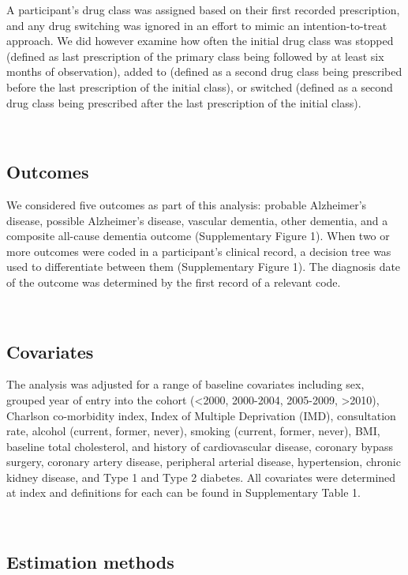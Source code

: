 \documentclass[a4paper, twoside]{templates/ociamthesis}
\begin{document}
A participant's drug class was assigned based on their first recorded prescription, and any drug switching was ignored in an effort to mimic an intention-to-treat approach. We did however examine how often the initial drug class was stopped (defined as last prescription of the primary class being followed by at least six months of observation), added to (defined as a second drug class being prescribed before the last prescription of the initial class), or switched (defined as a second drug class being prescribed after the last prescription of the initial class).

~

\hypertarget{outcomes}{%
\subsection{Outcomes}\label{outcomes}}

We considered five outcomes as part of this analysis: probable Alzheimer's disease, possible Alzheimer's disease, vascular dementia, other dementia, and a composite all-cause dementia outcome (Supplementary Figure 1). When two or more outcomes were coded in a participant's clinical record, a decision tree was used to differentiate between them (Supplementary Figure 1). The diagnosis date of the outcome was determined by the first record of a relevant code.

~

\hypertarget{covariates}{%
\subsection{Covariates}\label{covariates}}

The analysis was adjusted for a range of baseline covariates including sex, grouped year of entry into the cohort (\textless2000, 2000-2004, 2005-2009, \textgreater2010), Charlson co-morbidity index, Index of Multiple Deprivation (IMD), consultation rate, alcohol (current, former, never), smoking (current, former, never), BMI, baseline total cholesterol, and history of cardiovascular disease, coronary bypass surgery, coronary artery disease, peripheral arterial disease, hypertension, chronic kidney disease, and Type 1 and Type 2 diabetes. All
covariates were determined at index and definitions for each can be found in Supplementary Table 1.

~

\hypertarget{estimation-methods}{%
\subsection{Estimation methods}\label{estimation-methods}}
\end{document}
